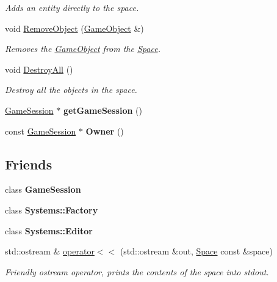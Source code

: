 \begin{DoxyCompactItemize}
\begin{DoxyCompactList}\small\item\em Adds an entity directly to the space. \end{DoxyCompactList}\item 
void \hyperlink{classDCEngine_1_1Space_a774faf01e4cd56c8349228920fb674c3}{Remove\-Object} (\hyperlink{classDCEngine_1_1GameObject}{Game\-Object} \&)
\begin{DoxyCompactList}\small\item\em Removes the \hyperlink{classDCEngine_1_1GameObject}{Game\-Object} from the \hyperlink{classDCEngine_1_1Space}{Space}. \end{DoxyCompactList}\item 
void \hyperlink{classDCEngine_1_1Space_a07cff6cdbba9e9266330e0fc3e432c2c}{Destroy\-All} ()
\begin{DoxyCompactList}\small\item\em Destroy all the objects in the space. \end{DoxyCompactList}\item 
\hypertarget{classDCEngine_1_1Space_aea769d26063d31cad10c732fa431fb59}{\hyperlink{classDCEngine_1_1GameSession}{Game\-Session} $\ast$ {\bfseries get\-Game\-Session} ()}\label{classDCEngine_1_1Space_aea769d26063d31cad10c732fa431fb59}

\item 
\hypertarget{classDCEngine_1_1Space_afee460e374f99e74ada367b67e2cb642}{const \hyperlink{classDCEngine_1_1GameSession}{Game\-Session} $\ast$ {\bfseries Owner} ()}\label{classDCEngine_1_1Space_afee460e374f99e74ada367b67e2cb642}

\end{DoxyCompactItemize}
\subsection*{Friends}
\begin{DoxyCompactItemize}
\item 
\hypertarget{classDCEngine_1_1Space_a457986e85a61e428e7f0a7350202e9d4}{class {\bfseries Game\-Session}}\label{classDCEngine_1_1Space_a457986e85a61e428e7f0a7350202e9d4}

\item 
\hypertarget{classDCEngine_1_1Space_a160097cc252ed86c269b6147933a7806}{class {\bfseries Systems\-::\-Factory}}\label{classDCEngine_1_1Space_a160097cc252ed86c269b6147933a7806}

\item 
\hypertarget{classDCEngine_1_1Space_a809f949c3297e4dc5c8c8c68503ca017}{class {\bfseries Systems\-::\-Editor}}\label{classDCEngine_1_1Space_a809f949c3297e4dc5c8c8c68503ca017}

\item 
std\-::ostream \& \hyperlink{classDCEngine_1_1Space_a5b896e0710ebf511cedd62356ea46f00}{operator$<$$<$} (std\-::ostream \&out, \hyperlink{classDCEngine_1_1Space}{Space} const \&space)
\begin{DoxyCompactList}\small\item\em Friendly ostream operator, prints the contents of the space into stdout. \end{DoxyCompactList}\end{DoxyCompactItemize}
